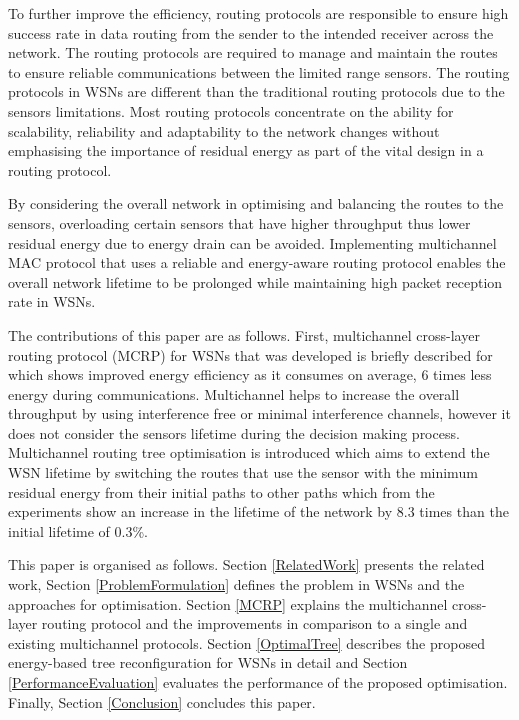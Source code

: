 To further improve the efficiency, routing protocols are responsible to ensure high success rate in data routing from the sender to the intended receiver across the network. 
The routing protocols are required to manage and maintain the routes to ensure reliable communications between the limited range sensors. The routing protocols in WSNs are different than the traditional routing protocols due to the sensors limitations. 
Most routing protocols concentrate on the ability for scalability, reliability and adaptability to the network changes without emphasising the importance of residual energy as part of the vital design in a routing protocol. 

By considering the overall network in optimising and balancing the routes to the sensors, overloading certain sensors that have higher throughput thus lower residual energy due to energy drain can be avoided.
Implementing multichannel MAC protocol that uses a reliable and energy-aware routing protocol enables the overall network lifetime to be prolonged while maintaining high packet reception rate in WSNs.

The contributions of this paper are as follows. First, multichannel cross-layer routing protocol (MCRP)\cite{mcrp} for WSNs that was developed is briefly described for which shows improved energy efficiency as it consumes on average, 6 times less energy during communications.
Multichannel helps to increase the overall throughput by using interference free or minimal interference channels, however it does not consider the sensors lifetime during the decision making process. Multichannel routing tree optimisation is introduced which aims to extend the WSN lifetime by switching the routes that use the sensor with the minimum residual energy from their initial paths to other paths which from the experiments show an increase in the lifetime of the network by 8.3 times than the initial lifetime of 0.3\%. 

This paper is organised as follows. Section \ref{RelatedWork} presents the related work, Section \ref{ProblemFormulation} defines the problem in WSNs and the approaches for optimisation. Section \ref{MCRP} explains the multichannel cross-layer routing protocol and the improvements in comparison to a single and existing multichannel protocols.
Section \ref{OptimalTree} describes the proposed energy-based tree reconfiguration for WSNs in detail and Section \ref{PerformanceEvaluation} evaluates the performance of the proposed optimisation. Finally, Section \ref{Conclusion} concludes this paper.
